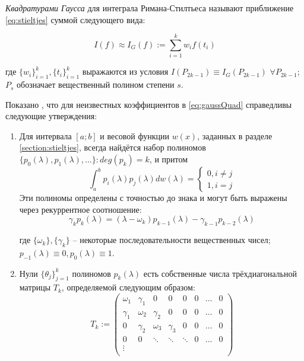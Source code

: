 \emph{Квадратурами Гаусса} для интеграла Римана-Стилтьеса называют приближение \eqref{eq:stieltjes} суммой следующего вида:

\begin{equation}\label{eq:gaussQuad}
    I(f) \approx I_G(f) := \sum_{i=1}^k w_i f(t_i)
\end{equation}

где $ \{w_i\}_{i=1}^k, \{t_i\}_{i=1}^k $ выражаются из условия $ I(P_{2k-1}) \equiv I_G(P_{2k-1}) $ $ \forall P_{2k-1} $; $ P_{s} $ обозначает вещественный полином степени $ s $.

Показано \cite{golub2013matcomput}, что для неизвестных коэффициентов в \eqref{eq:gaussQuad} справедливы следующие утверждения:

\begin{enumerate}
    \item Для интервала $ [a;b] $ и весовой функции $ w(x) $, заданных в разделе \ref{section:stieltjes}, всегда найдётся набор полиномов $ \{ p_0(\lambda), p_1(\lambda), ... \}: deg(p_k)=k $, и притом
    \[ \int_a^b p_i(\lambda)p_j(\lambda) dw(\lambda) = \begin{cases}
        0, i \ne j \\
        1, i = j
    \end{cases} \]
Эти полиномы определены с точностью до знака и могут быть выражены через рекуррентное соотношение:
\begin{equation}\label{eq:gaussRecur}
    \gamma_k p_k(\lambda) = (\lambda-\omega_k) p_{k-1}(\lambda) - \gamma_{k-1}p_{k-2}(\lambda)
\end{equation}

где $ \{\omega_k\}, \{\gamma_k\} $ -- некоторые последовательности вещественных чисел; $ p_{-1}(\lambda) \equiv 0, p_0(\lambda) \equiv 1 $.

\item Нули $ \{ \theta_j \}_{j=1}^k $ полиномов $ p_k(\lambda) $ есть собственные числа трёхдиагональной матрицы $ T_k $, определяемой следующим образом:
\begin{equation}\label{eq:Tk}
    T_k := \begin{pmatrix}
        \omega_1 & \gamma_1 & 0 & 0 & 0 & 0 & \dots & 0 \\
        \gamma_1 & \omega_2 & \gamma_2 & 0 & 0 & 0 & \dots & 0 \\
        0 & \gamma_2 & \omega_3 & \gamma_3 & 0 & 0 & \dots & 0 \\
        0 & 0 & \ddots & \ddots & \ddots & 0 & \dots & 0 \\
        \vdots \\
    \end{pmatrix}
\end{equation}


\end{enumerate}
